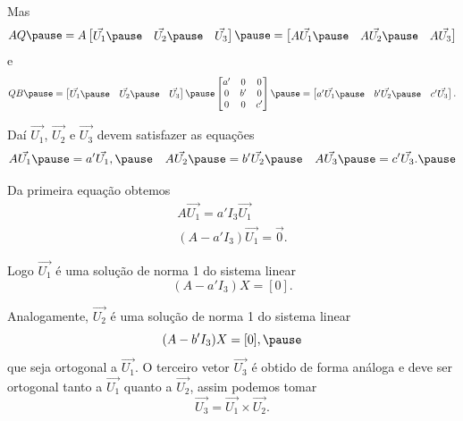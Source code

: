 \documentclass{beamer}
\begin{document}
\begin{frame}
    Mas
    \[
        AQ \pause = A \begin{bmatrix}
            \vec{U_1} \pause & \vec{U_2} \pause & \vec{U_3}
        \end{bmatrix} \pause = \begin{bmatrix}
            A\vec{U_1} \pause & A\vec{U_2} \pause & A\vec{U_3}
        \end{bmatrix}
    \]\pause
    e\pause
    \[
        QB \pause = \begin{bmatrix}
            \vec{U_1} \pause & \vec{U_2} \pause & \vec{U_3}
        \end{bmatrix}\pause \begin{bmatrix}
            a' & 0  & 0  \\
            0  & b' & 0  \\
            0  & 0  & c'
        \end{bmatrix} \pause = \begin{bmatrix}
            a'\vec{U_1} \pause & b'\vec{U_2} \pause & c'\vec{U_3}
        \end{bmatrix}.
    \]
\end{frame}

\begin{frame}
    Daí $\vec{U_1}$, \pause $\vec{U_2}$ \pause e $\vec{U_3}$ \pause devem satisfazer as equações\pause
    \[
        A\vec{U_1} \pause = a'\vec{U_1},\pause \quad A\vec{U_2} \pause = b'\vec{U_2} \pause \quad A\vec{U_3} \pause = c'\vec{U_3}.\pause
    \]

    Da primeira equação obtemos\pause
    \begin{align*}
        A\vec{U_1} = a'I_3\vec{U_1} \\
        (A - a'I_3)\vec{U_1} = \vec{0}.
    \end{align*}\pause

    Logo $\vec{U_1}$ \pause é uma solução de norma 1 do sistema linear\pause
    \[
        (A - a'I_3)X = [0].
    \]
\end{frame}

\begin{frame}
    Analogamente, $\vec{U_2}$ \pause é uma solução de norma 1 do sistema linear\pause
    \[
        (A - b'I_3)X = [0],\pause
    \]
    que seja ortogonal a $\vec{U_1}$. \pause O terceiro vetor $\vec{U_3}$ \pause é obtido de forma análoga \pause e deve ser ortogonal tanto a $\vec{U_1}$ \pause quanto a $\vec{U_2}$, \pause assim podemos tomar\pause
    \[
        \vec{U_3} = \vec{U_1}\times\vec{U_2}.
    \]
\end{frame}
\end{document}
